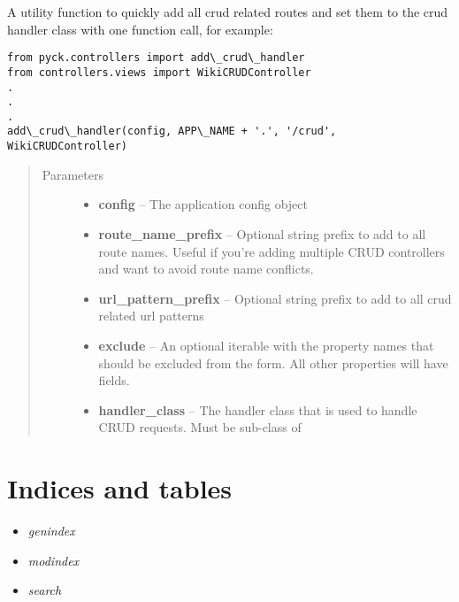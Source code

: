 \documentclass[letterpaper,10pt,english]{sphinxmanual}
\begin{document}
\begin{fulllineitems}
\label{pyck-controllers:pyck.controllers.add_crud_handler}
A utility function to quickly add all crud related routes and set them to the crud handler class with one function call, for example:

\begin{Verbatim}[commandchars=\\\{\}]
from pyck.controllers import add\_crud\_handler
from controllers.views import WikiCRUDController
.
.
.
add\_crud\_handler(config, APP\_NAME + '.', '/crud', WikiCRUDController)
\end{Verbatim}
\begin{quote}\begin{description}
\item[{Parameters}] \leavevmode\begin{itemize}
\item {} 
\textbf{config} -- The application config object

\item {} 
\textbf{route\_name\_prefix} -- Optional string prefix to add to all route names. Useful if you're adding multiple CRUD controllers and want to avoid route name conflicts.

\item {} 
\textbf{url\_pattern\_prefix} -- Optional string prefix to add to all crud related url patterns

\item {} 
\textbf{exclude} -- An optional iterable with the property names that should be excluded
from the form. All other properties will have fields.

\item {} 
\textbf{handler\_class} -- The handler class that is used to handle CRUD requests. Must be sub-class of {\hyperref[pyck-controllers:pyck.controllers.CRUDController]{}}

\end{itemize}

\end{description}\end{quote}

\end{fulllineitems}



\chapter{Indices and tables}
\label{index:indices-and-tables}\begin{itemize}
\item {} 
\emph{genindex}

\item {} 
\emph{modindex}

\item {} 
\emph{search}

\end{itemize}
\end{document}
